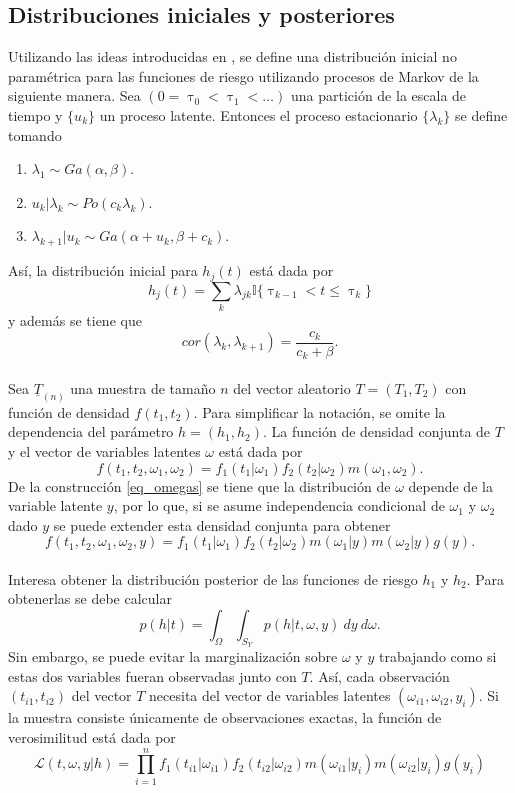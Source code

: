 \documentclass[11pt,a4paper]{article}
\begin{document}
\subsection{Distribuciones iniciales y posteriores}

Utilizando las ideas introducidas en \citet{old_nieto}, se define una distribución inicial no paramétrica para las funciones de riesgo utilizando procesos de Markov de la siguiente manera. Sea $(0 = \uptau_0 < \uptau_1 < \dots)$ una partición de la escala de tiempo  y $\lbrace u_k \rbrace$ un proceso latente. Entonces el proceso estacionario $\lbrace \lambda_k \rbrace$ se define tomando
\begin{enumerate}
\item $\lambda_1 \sim Ga(\alpha, \beta).$
\item $u_k | \lambda_k \sim Po(c_k\lambda_k).$
\item $\lambda_{k+1}|u_k \sim Ga(\alpha + u_k, \beta + c_k).$
\end{enumerate}
Así, la distribución inicial para $h_j(t)$ está dada por $$h_j(t) = \sum_k \lambda_{jk} \mathbb{I}\lbrace \uptau_{k-1} < t \leq \uptau_{k} \rbrace$$ y además se tiene que $$cor(\lambda_k, \lambda_{k+1}) = \frac{c_k}{c_k + \beta}.$$\\

Sea $\underline{T}_{(n)}$ una muestra de tamaño $n$ del vector aleatorio $T=(T_1, T_2)$ con función de densidad $f(t_1, t_2)$. Para simplificar la notación, se omite la dependencia del parámetro $h = (h_1, h_2).$ La función de densidad conjunta de $T$ y el vector de variables latentes $\omega$ está dada por $$f(t_1, t_2, \omega_1, \omega_2) = f_1(t_1|\omega_1)f_2(t_2|\omega_2)m(\omega_1, \omega_2).$$ De la construcción \eqref{eq_omegas} se tiene que la distribución de $\omega$ depende de la variable latente $y$, por lo que, si se asume independencia condicional de $\omega_1$ y $\omega_2$ dado $y$ se puede extender esta densidad conjunta para obtener
$$f(t_1, t_2, \omega_1, \omega_2, y)= f_1(t_1|\omega_1)f_2(t_2|\omega_2)m(\omega_1|y)m(\omega_2|y)g(y).$$\\

Interesa obtener la distribución posterior de las funciones de riesgo $h_1$ y $h_2$. Para obtenerlas se debe calcular $$p(h | t) = \int_{\Omega} \int_{S_Y} p(h | t, \omega, y) \ dy \ d\omega.$$ Sin embargo, se puede evitar la marginalización sobre $\omega$ y $y$ trabajando como si estas dos variables fueran observadas junto con $T$. Así, cada observación $(t_{i1}, t_{i2})$ del vector $T$ necesita del vector de variables latentes $(\omega_{i1}, \omega_{i2}, y_i)$. Si la muestra consiste únicamente de observaciones exactas, la función de verosimilitud está dada por 
$$\mathcal{L}(t, \omega, y | h) = \prod_{i=1}^n f_1(t_{i1}|\omega_{i1})f_2(t_{i2}|\omega_{i2})m(\omega_{i1}|y_i)m(\omega_{i2}|y_i)g(y_i)$$\\
\end{document}
